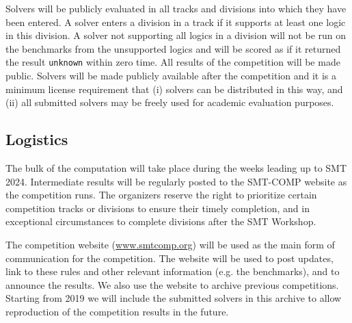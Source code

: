 \documentclass[12pt]{article}
\newcommand{\rem}[1]{\textcolor{red}{[#1]}}
\newcommand{\an}[1]{\rem{#1 -- aina}}
\begin{document}
Solvers will be publicly evaluated in all tracks and divisions into
which they have been entered.
%
A solver enters a division in a track if it supports at least one
logic in this division.
%
A solver not supporting all logics in a division will not be run on
the benchmarks from the unsupported logics and will be scored as if it
returned the result \texttt{unknown} within zero time.
%
All results of the competition will be made public. Solvers will be
made publicly available after the competition and it is a minimum
license requirement that (i) solvers can be distributed in this way,
and (ii) all submitted solvers may be freely used for academic
evaluation purposes.



\subsection{Logistics}
\label{sec:logistics}

%
The bulk of the computation will take place during the weeks leading
up to SMT 2024.  Intermediate results will be regularly posted to the
SMT-COMP website as the competition runs.
%
The organizers reserve the right to prioritize certain competition
tracks or divisions to ensure their timely completion, and in
exceptional circumstances to complete divisions after the SMT
Workshop.


The competition website (\url{www.smtcomp.org}) will be used as the main form
of communication for the competition. The website will be used to post updates,
link to these rules and other relevant information (e.g. the benchmarks), and
to announce the results. We also use the website to archive previous
competitions. Starting from 2019 we will include the submitted solvers in this
archive to allow reproduction of the competition results in the future.
%
\end{document}

